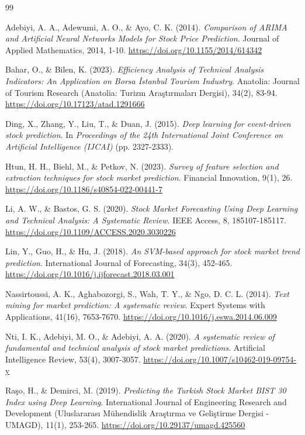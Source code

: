 \documentclass[12pt,a4paper]{report}
\begin{document}
\begin{thebibliography}{99}

Adebiyi, A. A., Adewumi, A. O., \& Ayo, C. K. (2014). \emph{Comparison of ARIMA and Artificial Neural Networks Models for Stock Price Prediction}. Journal of Applied Mathematics, 2014, 1-10. \url{https://doi.org/10.1155/2014/614342}

Bahar, O., \& Bilen, K. (2023). \emph{Efficiency Analysis of Technical Analysis Indicators: An Application on Borsa İstanbul Tourism Industry}. Anatolia: Journal of Tourism Research (Anatolia: Turizm Araştırmaları Dergisi), 34(2), 83-94. \url{https://doi.org/10.17123/atad.1291666}

Ding, X., Zhang, Y., Liu, T., \& Duan, J. (2015). \emph{Deep learning for event-driven stock prediction}. In \emph{Proceedings of the 24th International Joint Conference on Artificial Intelligence (IJCAI)} (pp. 2327-2333).

Htun, H. H., Biehl, M., \& Petkov, N. (2023). \emph{Survey of feature selection and extraction techniques for stock market prediction}. Financial Innovation, 9(1), 26. \url{https://doi.org/10.1186/s40854-022-00441-7}

Li, A. W., \& Bastos, G. S. (2020). \emph{Stock Market Forecasting Using Deep Learning and Technical Analysis: A Systematic Review}. IEEE Access, 8, 185107-185117. \url{https://doi.org/10.1109/ACCESS.2020.3030226}

Lin, Y., Guo, H., \& Hu, J. (2018). \emph{An SVM-based approach for stock market trend prediction}. International Journal of Forecasting, 34(3), 452-465. \url{https://doi.org/10.1016/j.ijforecast.2018.03.001}

Nassirtoussi, A. K., Aghabozorgi, S., Wah, T. Y., \& Ngo, D. C. L. (2014). \emph{Text mining for market prediction: A systematic review}. Expert Systems with Applications, 41(16), 7653-7670. \url{https://doi.org/10.1016/j.eswa.2014.06.009}

Nti, I. K., Adebiyi, M. O., \& Adebiyi, A. A. (2020). \emph{A systematic review of fundamental and technical analysis of stock market predictions}. Artificial Intelligence Review, 53(4), 3007-3057. \url{https://doi.org/10.1007/s10462-019-09754-y}

Raşo, H., \& Demirci, M. (2019). \emph{Predicting the Turkish Stock Market BIST 30 Index using Deep Learning}. International Journal of Engineering Research and Development (Uluslararası Mühendislik Araştırma ve Geliştirme Dergisi - UMAGD), 11(1), 253-265. \url{https://doi.org/10.29137/umagd.425560}


\end{thebibliography}
\end{document}
